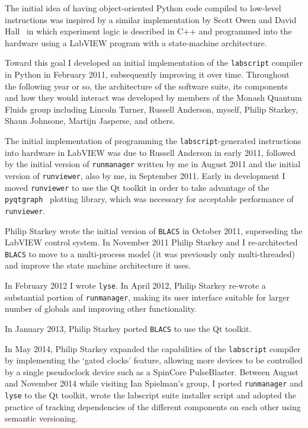The initial idea of having object-oriented Python code compiled to low-level instructions was inspired by a similar implementation by Scott Owen and David Hall~\cite{owen_fast_2003} in which experiment logic is described in C++ and programmed into the hardware using a LabVIEW program with a state-machine architecture.

Toward this goal I developed an initial implementation of the \texttt{labscript} compiler in Python in February 2011, subsequently improving it over time. Throughout the following year or so, the architecture of the software suite, its components and how they would interact was developed by members of the Monash Quantum Fluids group including Lincoln Turner, Russell Anderson, myself, Philip Starkey, Shaun Johnsone, Martijn Jasperse, and others.

The initial implementation of programming the \texttt{labscript}-generated instructions into hardware in LabVIEW was due to Russell Anderson in early 2011, followed by the initial version of \texttt{runmanager} written by me in August 2011 and the initial version of \texttt{runviewer}, also by me, in September 2011. Early in development I moved \texttt{runviewer} to use the Qt toolkit in order to take advantage of the \texttt{pyqtgraph}~\cite{campagnola_pyqtgraph_2016} plotting library, which was necessary for acceptable performance of \texttt{runviewer}.

Philip Starkey wrote the initial version of \texttt{BLACS} in October 2011, superseding the LabVIEW control system. In November 2011 Philip Starkey and I re-architected \texttt{BLACS} to move to a multi-process model (it was previously only multi-threaded) and improve the state machine architecture it uses.

In February 2012 I wrote \texttt{lyse}. In April 2012, Philip Starkey re-wrote a substantial portion of \texttt{runmanager}, making its user interface suitable for larger number of globals and improving other functionality.

In January 2013, Philip Starkey ported \texttt{BLACS} to use the Qt toolkit.

In May 2014, Philip Starkey expanded the capabilities of the \texttt{labscript} compiler by implementing the `gated clocks' feature, allowing more devices to be controlled by a single pseudoclock device such as a SpinCore PulseBlaster. Between August and November 2014 while visiting Ian Spielman's group, I ported \texttt{runmanager} and \texttt{lyse} to the Qt toolkit, wrote the labscript suite installer script and adopted the practice of tracking dependencies of the different components on each other using semantic versioning.

